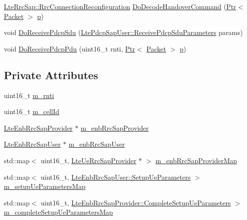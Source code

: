 \begin{DoxyCompactItemize}
\item 
\hyperlink{structns3_1_1LteRrcSap_1_1RrcConnectionReconfiguration}{Lte\+Rrc\+Sap\+::\+Rrc\+Connection\+Reconfiguration} \hyperlink{classns3_1_1MmWaveLteEnbRrcProtocolReal_a508797b0b39cb25f73f4012c5e3f21c1}{Do\+Decode\+Handover\+Command} (\hyperlink{classns3_1_1Ptr}{Ptr}$<$ \hyperlink{classns3_1_1Packet}{Packet} $>$ \hyperlink{lte__link__budget__x2__handover__measures_8m_ac9de518908a968428863f829398a4e62}{p})
\item 
void \hyperlink{classns3_1_1MmWaveLteEnbRrcProtocolReal_ae7cb4463bfef6109964b637eec0b06e6}{Do\+Receive\+Pdcp\+Sdu} (\hyperlink{structns3_1_1LtePdcpSapUser_1_1ReceivePdcpSduParameters}{Lte\+Pdcp\+Sap\+User\+::\+Receive\+Pdcp\+Sdu\+Parameters} params)
\item 
void \hyperlink{classns3_1_1MmWaveLteEnbRrcProtocolReal_a371497aa86dd37d19a635fb369a15542}{Do\+Receive\+Pdcp\+Pdu} (uint16\+\_\+t rnti, \hyperlink{classns3_1_1Ptr}{Ptr}$<$ \hyperlink{classns3_1_1Packet}{Packet} $>$ \hyperlink{lte__link__budget__x2__handover__measures_8m_ac9de518908a968428863f829398a4e62}{p})
\end{DoxyCompactItemize}
\subsection*{Private Attributes}
\begin{DoxyCompactItemize}
\item 
uint16\+\_\+t \hyperlink{classns3_1_1MmWaveLteEnbRrcProtocolReal_af8ae29bed8df369bc9bdbd537ba36d8d}{m\+\_\+rnti}
\item 
uint16\+\_\+t \hyperlink{classns3_1_1MmWaveLteEnbRrcProtocolReal_af21fba3734d1818dc9166e6ab8817b66}{m\+\_\+cell\+Id}
\item 
\hyperlink{classns3_1_1LteEnbRrcSapProvider}{Lte\+Enb\+Rrc\+Sap\+Provider} $\ast$ \hyperlink{classns3_1_1MmWaveLteEnbRrcProtocolReal_af89474441e0041b55d1e24a5bd73df15}{m\+\_\+enb\+Rrc\+Sap\+Provider}
\item 
\hyperlink{classns3_1_1LteEnbRrcSapUser}{Lte\+Enb\+Rrc\+Sap\+User} $\ast$ \hyperlink{classns3_1_1MmWaveLteEnbRrcProtocolReal_a46eee634a1a7c1e649fccb018116376d}{m\+\_\+enb\+Rrc\+Sap\+User}
\item 
std\+::map$<$ uint16\+\_\+t, \hyperlink{classns3_1_1LteUeRrcSapProvider}{Lte\+Ue\+Rrc\+Sap\+Provider} $\ast$ $>$ \hyperlink{classns3_1_1MmWaveLteEnbRrcProtocolReal_a6ad34a29c142602d2a58b0bfb718c22b}{m\+\_\+enb\+Rrc\+Sap\+Provider\+Map}
\item 
std\+::map$<$ uint16\+\_\+t, \hyperlink{structns3_1_1LteEnbRrcSapUser_1_1SetupUeParameters}{Lte\+Enb\+Rrc\+Sap\+User\+::\+Setup\+Ue\+Parameters} $>$ \hyperlink{classns3_1_1MmWaveLteEnbRrcProtocolReal_a3df42581baab5d1a95e3a7f280d0e831}{m\+\_\+setup\+Ue\+Parameters\+Map}
\item 
std\+::map$<$ uint16\+\_\+t, \hyperlink{structns3_1_1LteEnbRrcSapProvider_1_1CompleteSetupUeParameters}{Lte\+Enb\+Rrc\+Sap\+Provider\+::\+Complete\+Setup\+Ue\+Parameters} $>$ \hyperlink{classns3_1_1MmWaveLteEnbRrcProtocolReal_a65fe977be115e41fa70bf4b2dce26d41}{m\+\_\+complete\+Setup\+Ue\+Parameters\+Map}
\end{DoxyCompactItemize}
